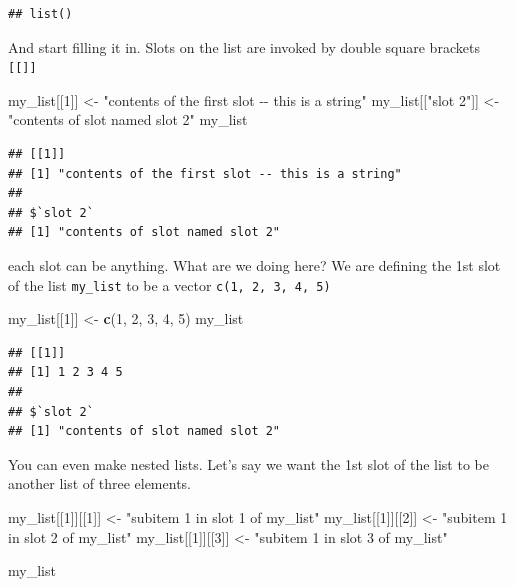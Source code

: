 \documentclass[
]{book}
\newenvironment{Shaded}{\begin{snugshade}}{\end{snugshade}}
\newcommand{\DecValTok}[1]{\textcolor[rgb]{0.00,0.00,0.81}{#1}}
\newcommand{\KeywordTok}[1]{\textcolor[rgb]{0.13,0.29,0.53}{\textbf{#1}}}
\newcommand{\NormalTok}[1]{#1}
\newcommand{\StringTok}[1]{\textcolor[rgb]{0.31,0.60,0.02}{#1}}
\theoremstyle{definition}
\theoremstyle{definition}
\theoremstyle{definition}
\theoremstyle{remark}
\begin{document}
\begin{verbatim}
## list()
\end{verbatim}

And start filling it in. Slots on the list are invoked by double square brackets \texttt{{[}{[}{]}{]}}

\begin{Shaded}
\begin{Highlighting}[]
\NormalTok{my\_list[[}\DecValTok{1}\NormalTok{]] <{-}}\StringTok{ "contents of the first slot {-}{-} this is a string"}
\NormalTok{my\_list[[}\StringTok{"slot 2"}\NormalTok{]] <{-}}\StringTok{ "contents of slot named slot 2"}
\NormalTok{my\_list}
\end{Highlighting}
\end{Shaded}

\begin{verbatim}
## [[1]]
## [1] "contents of the first slot -- this is a string"
## 
## $`slot 2`
## [1] "contents of slot named slot 2"
\end{verbatim}

each slot can be anything. What are we doing here? We are defining the 1st slot of the list \texttt{my\_list} to be a vector \texttt{c(1,\ 2,\ 3,\ 4,\ 5)}

\begin{Shaded}
\begin{Highlighting}[]
\NormalTok{my\_list[[}\DecValTok{1}\NormalTok{]] <{-}}\StringTok{ }\KeywordTok{c}\NormalTok{(}\DecValTok{1}\NormalTok{, }\DecValTok{2}\NormalTok{, }\DecValTok{3}\NormalTok{, }\DecValTok{4}\NormalTok{, }\DecValTok{5}\NormalTok{)}
\NormalTok{my\_list}
\end{Highlighting}
\end{Shaded}

\begin{verbatim}
## [[1]]
## [1] 1 2 3 4 5
## 
## $`slot 2`
## [1] "contents of slot named slot 2"
\end{verbatim}

You can even make nested lists. Let's say we want the 1st slot of the list to be another list of three elements.

\begin{Shaded}
\begin{Highlighting}[]
\NormalTok{my\_list[[}\DecValTok{1}\NormalTok{]][[}\DecValTok{1}\NormalTok{]] <{-}}\StringTok{ "subitem 1 in slot 1 of my\_list"}
\NormalTok{my\_list[[}\DecValTok{1}\NormalTok{]][[}\DecValTok{2}\NormalTok{]] <{-}}\StringTok{ "subitem 1 in slot 2 of my\_list"}
\NormalTok{my\_list[[}\DecValTok{1}\NormalTok{]][[}\DecValTok{3}\NormalTok{]] <{-}}\StringTok{ "subitem 1 in slot 3 of my\_list"}

\NormalTok{my\_list}
\end{Highlighting}
\end{Shaded}
\end{document}

